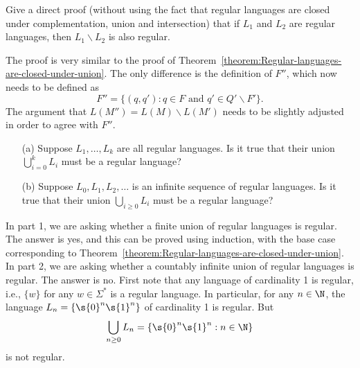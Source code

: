 \begin{flex}
\label{grp:exercise:Direct-proof-that-regular-languages-are-closed-under-difference}

\begin{exercise}
\label{exercise:Direct-proof-that-regular-languages-are-closed-under-difference}
Give a direct proof (without using the fact that regular languages are closed under complementation, union and intersection) that if $L_1$ and $L_2$ are regular languages, then $L_1 \backslash L_2$ is also regular.

\end{exercise}

\begin{solution}
\label{sol:deterministic-finite-automata::similar}
The proof is very similar to the proof of Theorem~\ref{theorem:Regular-languages-are-closed-under-union}. The only difference is the definition of $F''$, which now needs to be defined as
\[
F'' = \{(q, q') : q \in F \text{ and } q' \in Q' \backslash F'\}.
\]
The argument that $L(M'') = L(M) \backslash L(M')$ needs to be slightly adjusted in order to agree with $F''$.

\end{solution}
\end{flex}

\begin{flex}
\label{grp:exercise:Finite-vs-infinite-union}

\begin{exercise}
\label{exercise:Finite-vs-infinite-union}
\begin{enumerate}
    \item[(a)] Suppose $L_1, \ldots, L_k$ are all regular languages. 
    Is it true that their union $\bigcup_{i=0}^k L_i$ must be a regular language?      
    \item[(b)] Suppose $L_0, L_1, L_2, \ldots$ is an infinite sequence of regular languages. 
    Is it true that their union $\bigcup_{i\geq 0} L_i$ must be a regular language?
\end{enumerate}

\end{exercise}

\begin{solution}
\label{sol:deterministic-finite-automata::part}
In part 1, we are asking whether a finite union of regular languages is regular. The answer is yes, and this can be proved using induction, with the base case corresponding to Theorem~\ref{theorem:Regular-languages-are-closed-under-union}. In part 2, we are asking whether a countably infinite union of regular languages is regular. The answer is no. First note that any language of cardinality 1 is regular, i.e., $\{w\}$ for any $w \in \Sigma^*$ is a regular language. In particular, for any $n \in \N$, the language $L_n = \{\s{0}^n\s{1}^n\}$ of cardinality 1 is regular. But
\[
\bigcup_{n\geq 0} L_n = \{\s{0}^n\s{1}^n : n \in \N\}
\]
is not regular.

\end{solution}
\end{flex}

